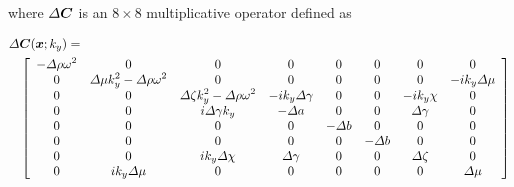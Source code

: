 where ${\mit \Delta} {\mbox{\boldmath$\mit C$\unboldmath}}$ is an $8 \times 8$ multiplicative operator 
defined as
\begin{samepage}
\begin{eqnarray*}
\lefteqn{
{\mit \Delta}{\bmi C}({\bmi x};k_y)=}\\
&&
\left[{\begin{array}{cccccccc}
\displaystyle - {\mit \Delta}\rho {\omega }^{ 2}& \displaystyle 0& 
\displaystyle 0& \displaystyle 0& \displaystyle 0& \displaystyle 0& 
\displaystyle 0& \displaystyle 0\\ \displaystyle 0& \displaystyle {\mit \Delta}\mu { 
k}_{ y}^{ 2} - {\mit \Delta}\rho {\omega }^{ 2}& \displaystyle 0& \displaystyle 0& 
\displaystyle 0& \displaystyle 0& \displaystyle 0& \displaystyle -i{k}_{y} 
{\mit \Delta}\mu \\ \displaystyle 0& \displaystyle 0& \displaystyle {\mit \Delta}\zeta { k}_{ y}^{ 2} 
- {\mit \Delta}\rho {\omega }^{ 2}& \displaystyle -i{k}_{y} {\mit \Delta}\gamma & \displaystyle 0& 
\displaystyle 0& \displaystyle -i{k}_{y} \chi & \displaystyle 0\\ 
\displaystyle 0& \displaystyle 0& \displaystyle i {\mit \Delta}\gamma { k}_{ y}& 
\displaystyle -{\mit \Delta}a& \displaystyle 0& \displaystyle 0& \displaystyle {\mit \Delta}\gamma & 
\displaystyle 0\\ \displaystyle 0& \displaystyle 0& \displaystyle 0& 
\displaystyle 0& \displaystyle -{\mit \Delta}b& \displaystyle 0& \displaystyle 0& 
\displaystyle 0\\ \displaystyle 0& \displaystyle 0& \displaystyle 0& 
\displaystyle 0& \displaystyle 0& \displaystyle -{\mit \Delta}b& \displaystyle 0& 
\displaystyle 0\\ \displaystyle 0& \displaystyle 0& \displaystyle i{k}_{y} 
{\mit \Delta}\chi & \displaystyle {\mit \Delta}\gamma & \displaystyle 0& \displaystyle 0& 
\displaystyle {\mit \Delta}\zeta & \displaystyle 0\\ \displaystyle 0& \displaystyle 
i{k}_{y} {\mit \Delta}\mu & \displaystyle 0& \displaystyle 0& \displaystyle 0& 
\displaystyle 0& \displaystyle 0& \displaystyle {\mit \Delta}\mu 
\end{array}}\right]\nonumber 
\end{eqnarray*}
\end{samepage}

